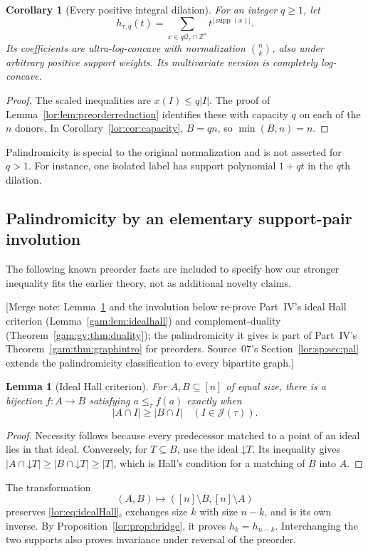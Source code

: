 \documentclass[11pt]{article}
\numberwithin{equation}{section}
\newtheorem{lemma}[theorem]{Lemma}
\newtheorem{corollary}[theorem]{Corollary}
\theoremstyle{definition}
\newcommand{\Z}{\mathbb Z}
\newcommand{\J}{\mathcal J(\tau)}
\newcommand{\Qt}{\mathcal Q_\tau}
\newcommand{\supp}{\operatorname{supp}}
\newcommand{\down}{\mathord\downarrow}
\begin{document}
\begin{corollary}[Every positive integral dilation]\label{lor:cor:dilation}
For an integer $q\ge1$, let
\[
 h_{\tau,q}(t)=\sum_{x\in q\Qt\cap\Z^n}t^{|\supp(x)|}.
\]
Its coefficients are ultra-log-concave with normalization $\binom n k$,
also under arbitrary positive support weights. Its multivariate version
is completely log-concave.
\end{corollary}
\begin{proof}
The scaled inequalities are $x(I)\le q|I|$. The proof of
Lemma~\ref{lor:lem:preorderreduction} identifies these with capacity $q$ on
each of the $n$ donors. In Corollary~\ref{lor:cor:capacity}, $B=qn$, so
$\min(B,n)=n$.
\end{proof}
Palindromicity is special to the original normalization and is not asserted
for $q>1$. For instance, one isolated label has support polynomial
$1+qt$ in the $q$th dilation.

\subsection{Palindromicity by an elementary support-pair involution}
The following known preorder facts are included to specify how our stronger
inequality fits the earlier theory, not as additional novelty claims.

[Merge note: Lemma~\ref{lor:lem:idealhall} and the involution below re-prove
Part~IV's ideal Hall criterion (Lemma~\ref{gam:lem:idealhall}) and
complement-duality (Theorem~\ref{gam:gv:thm:duality}); the palindromicity it
gives is part of Part~IV's Theorem~\ref{gam:thm:graphintro} for
preorders. Source~07's Section~\ref{lor:sp:sec:pal} extends the
palindromicity classification to every bipartite graph.]
\begin{lemma}[Ideal Hall criterion]\label{lor:lem:idealhall}
For $A,B\subseteq[n]$ of equal size, there is a bijection
$f:A\to B$ satisfying $a\le_\tau f(a)$ exactly when
\begin{equation}
 |A\cap I|\ge |B\cap I|\quad(I\in\J).
 \label{lor:eq:idealHall}
\end{equation}
\end{lemma}
\begin{proof}
Necessity follows because every predecessor matched to a point of an ideal
lies in that ideal. Conversely, for $T\subseteq B$, use the ideal
$\down T$. Its inequality gives
$|A\cap\down T|\ge|B\cap\down T|\ge|T|$, which is Hall's condition for
a matching of $B$ into $A$.
\end{proof}
The transformation
\begin{equation}
 (A,B)\longmapsto([n]\setminus B,[n]\setminus A)
 \label{lor:eq:complement}
\end{equation}
preserves \eqref{lor:eq:idealHall}, exchanges size $k$ with size $n-k$, and
is its own inverse. By Proposition~\ref{lor:prop:bridge}, it proves
$h_k=h_{n-k}$. Interchanging the two supports also proves invariance under
reversal of the preorder.
\end{document}
